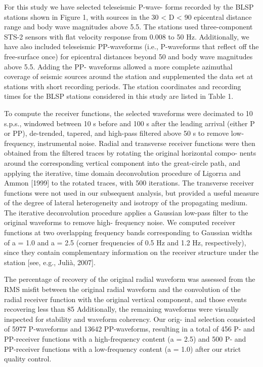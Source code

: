 \documentclass[long]{geophysics}
\begin{document}
For this study we have selected teleseismic P-wave-
forms recorded by the BLSP stations shown in Figure 1,
with sources in the 30 < D < 90 epicentral distance range
and body wave magnitudes above 5.5. The stations used
three-component STS-2 sensors with flat velocity response
from 0.008 to 50 Hz. Additionally, we have also included
teleseismic PP-waveforms (i.e., P-waveforms that reflect off
the free-surface once) for epicentral distances beyond 50
and body wave magnitudes above 5.5. Adding the PP-
waveforms allowed a more complete azimuthal coverage
of seismic sources around the station and supplemented the
data set at stations with short recording periods. The station
coordinates and recording times for the BLSP stations
considered in this study are listed in Table 1.

To compute the receiver functions, the selected
waveforms were decimated to 10 s.p.s., windowed between
10 s before and 100 s after the leading arrival (either P or
PP), de-trended, tapered, and high-pass filtered above 50 s
to remove low-frequency, instrumental noise. Radial and
transverse receiver functions were then obtained from the
filtered traces by rotating the original horizontal compo-
nents around the corresponding vertical component into the
great-circle path, and applying the iterative, time domain
deconvolution procedure of Ligorrıa and Ammon [1999] to
the rotated traces, with 500 iterations. The transverse
receiver functions were not used in our subsequent analysis,
but provided a useful measure of the degree of lateral
heterogeneity and isotropy of the propagating medium.
The iterative deconvolution procedure applies a Gaussian
low-pass filter to the original waveforms to remove high-
frequency noise. We computed receiver functions at two
overlapping frequency bands corresponding to Gaussian
widths of a = 1.0 and a = 2.5 (corner frequencies of
0.5 Hz and 1.2 Hz, respectively), since they contain
complementary information on the receiver structure under
the station [see, e.g., Julià, 2007].

The percentage of recovery of the original radial
waveform was assessed from the RMS misfit between the
original radial waveform and the convolution of the radial
receiver function with the original vertical component, and
those events recovering less than 85%
Additionally, the remaining waveforms were visually
inspected for stability and waveform coherency. Our orig-
inal selection consisted of 5977 P-waveforms and 13642
PP-waveforms, resulting in a total of 456 P- and PP-receiver
functions with a high-frequency content (a = 2.5) and 500
P- and PP-receiver functions with a low-frequency content
(a = 1.0) after our strict quality control.
\end{document}
